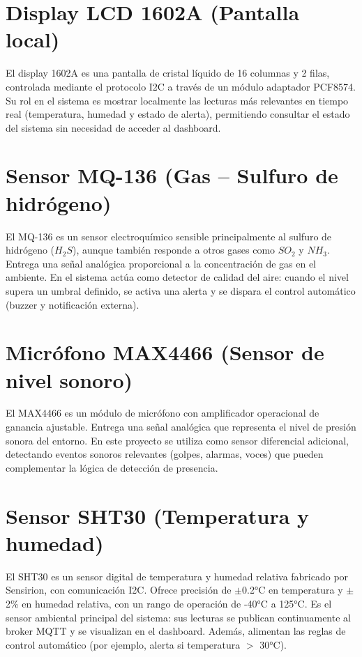 \documentclass[12pt, a4paper]{report}
\begin{document}
\section*{Display LCD 1602A (Pantalla local)}

El display 1602A es una pantalla de cristal líquido de 16 columnas y 2 filas, controlada mediante el protocolo I2C a través de un módulo adaptador PCF8574. Su rol en el sistema es mostrar localmente las lecturas más relevantes en tiempo real (temperatura, humedad y estado de alerta), permitiendo consultar el estado del sistema sin necesidad de acceder al dashboard.

\section*{Sensor MQ-136 (Gas -- Sulfuro de hidrógeno)}

El MQ-136 es un sensor electroquímico sensible principalmente al sulfuro de hidrógeno ($H_2S$), aunque también responde a otros gases como $SO_2$ y $NH_3$. Entrega una señal analógica proporcional a la concentración de gas en el ambiente. En el sistema actúa como detector de calidad del aire: cuando el nivel supera un umbral definido, se activa una alerta y se dispara el control automático (buzzer y notificación externa).

\section*{Micrófono MAX4466 (Sensor de nivel sonoro)}

El MAX4466 es un módulo de micrófono con amplificador operacional de ganancia ajustable. Entrega una señal analógica que representa el nivel de presión sonora del entorno. En este proyecto se utiliza como sensor diferencial adicional, detectando eventos sonoros relevantes (golpes, alarmas, voces) que pueden complementar la lógica de detección de presencia.

\section*{Sensor SHT30 (Temperatura y humedad)}

El SHT30 es un sensor digital de temperatura y humedad relativa fabricado por Sensirion, con comunicación I2C. Ofrece precisión de $\pm$0.2°C en temperatura y $\pm$2\% en humedad relativa, con un rango de operación de -40°C a 125°C. Es el sensor ambiental principal del sistema: sus lecturas se publican continuamente al broker MQTT y se visualizan en el dashboard. Además, alimentan las reglas de control automático (por ejemplo, alerta si temperatura $>$ 30°C).
\end{document}
